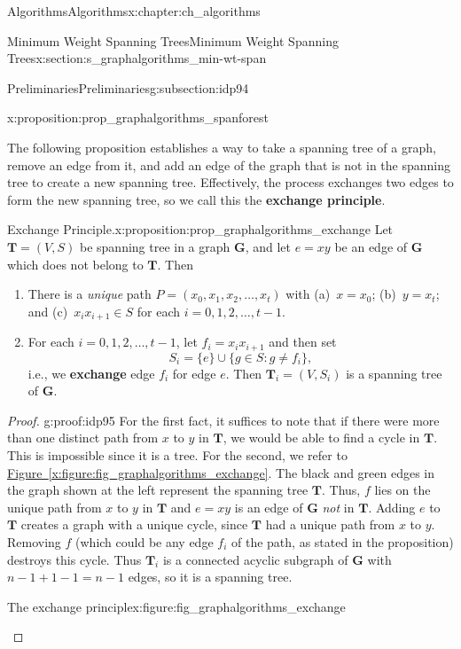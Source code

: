\documentclass[oneside,10pt,]{book}
\newcommand{\xreffont}{\relax}
\newcommand{\terminology}[1]{\textbf{#1}}
\numberwithin{equation}{section}
\newcommand{\bfG}{\mathbf{G}}
\newcommand{\bfT}{\mathbf{T}}
\begin{document}
\begin{chapterptx}{Algorithms}{}{Algorithms}{}{}{x:chapter:ch_algorithms}
\begin{sectionptx}{Minimum Weight Spanning Trees}{}{Minimum Weight Spanning Trees}{}{}{x:section:s_graphalgorithms_min-wt-span}
\begin{subsectionptx}{Preliminaries}{}{Preliminaries}{}{}{g:subsection:idp94}
\begin{proposition}{}{}{x:proposition:prop_graphalgorithms_spanforest}
\end{proposition}
The following proposition establishes a way to take a spanning tree of a graph, remove an edge from it, and add an edge of the graph that is not in the spanning tree to create a new spanning tree. Effectively, the process exchanges two edges to form the new spanning tree, so we call this the \terminology{exchange principle}.%
\begin{proposition}{Exchange Principle.}{}{x:proposition:prop_graphalgorithms_exchange}%
Let \(\bfT=(V,S)\) be spanning tree in a graph \(\bfG\), and let \(e=xy\) be an edge of \(\bfG\) which does not belong to \(\bfT\). Then%
\begin{enumerate}
\item{}There is a \emph{unique} path \(P=(x_0,x_1,x_2,\dots,x_t)\) with (a)~\(x=x_0\); (b)~\(y=x_t\); and (c)~\(x_ix_{i+1}\in S\) for each \(i=0,1,2,\dots,t-1\).%
\item{}For each \(i=0,1,2,\dots,t-1\), let \(f_i=x_ix_{i+1}\) and then set%
\begin{equation*}
S_i = \{e\}\cup\{g\in S: g\neq f_i\},
\end{equation*}
i.e.\@, we \terminology{exchange} edge \(f_i\) for edge \(e\). Then \(\bfT_i=(V,S_i)\) is a spanning tree of \(\bfG\).%
\end{enumerate}
%
\end{proposition}
\begin{proof}{}{g:proof:idp95}
For the first fact, it suffices to note that if there were more than one distinct path from \(x\) to \(y\) in \(\bfT\), we would be able to find a cycle in \(\bfT\). This is impossible since it is a tree. For the second, we refer to \hyperref[x:figure:fig_graphalgorithms_exchange]{Figure~{\xreffont\ref{x:figure:fig_graphalgorithms_exchange}}}. The black and green edges in the graph shown at the left represent the spanning tree \(\bfT\). Thus, \(f\) lies on the unique path from \(x\) to \(y\) in \(\bfT\) and \(e=xy\) is an edge of \(\bfG\) \emph{not} in \(\bfT\). Adding \(e\) to \(\bfT\) creates a graph with a unique cycle, since \(\bfT\) had a unique path from \(x\) to \(y\). Removing \(f\) (which could be any edge \(f_i\) of the path, as stated in the proposition) destroys this cycle. Thus \(\bfT_i\) is a connected acyclic subgraph of \(\bfG\) with \(n-1+1-1=n-1\) edges, so it is a spanning tree.%
\begin{figureptx}{The exchange principle}{x:figure:fig_graphalgorithms_exchange}{}%
\begin{sidebyside}{2}{0.01}{0.01}{0.02}%

\end{sidebyside}
\end{figureptx}
\end{proof}
\end{subsectionptx}
\end{sectionptx}
\end{chapterptx}
\end{document}
